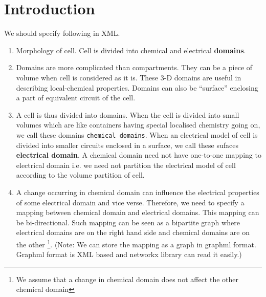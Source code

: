 \section{Introduction}

    We should specify following in XML.

    \begin{enumerate}
    
      \item Morphology of cell. Cell is divided into chemical and electrical
        \textbf{domains}.
      
      \item Domains are more complicated than compartments. They can be a piece
        of volume when cell is considered as it is. These 3-D domains are useful
        in describing local-chemical properties. Domains can also be ``surface''
        enclosing a part of equivalent circuit of the cell. 

      \item A cell is thus divided into domains. When the cell is divided into
        small volumes which are like containers having special localised
        chemistry going on, we call these domains \texttt{chemical domains}.
        When an electrical model of cell is divided into smaller circuits
        enclosed in a surface, we call these sufaces \textbf{electrical domain}.
        A chemical domain need not have one-to-one mapping to electrical domain
        i.e. we need not partition the electrical model of cell according to the volume
        partition of cell. 

      \item A change occurring in chemical domain can influence the electrical
        properties of some electrical domain and vice verse. Therefore, we need
        to specify a mapping between chemical domain and electrical domains.
        This mapping can be bi-directional. Such mapping can be seen as a
        bipartite graph where electrical domains are on the right hand side and
        chemical domains are on the other \footnote{We assume that a change in
          chemical domain does not affect the other chemical domain}. (Note: We
          can store the mapping as a graph in graphml format. Graphml format is
        XML based and networkx library can read it easily.)
    
    \end{enumerate}
   
